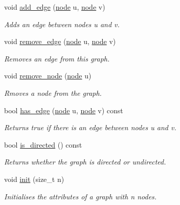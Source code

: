\begin{DoxyCompactItemize}
void \hyperlink{classlgraph_1_1udgraph_a4b847dd4d6d2e814f30bcddccc16cfc6}{add\+\_\+edge} (\hyperlink{namespacelgraph_a397169dd66adf725210a30fb7251773e}{node} u, \hyperlink{namespacelgraph_a397169dd66adf725210a30fb7251773e}{node} v)
\begin{DoxyCompactList}\small\item\em Adds an edge between nodes {\itshape u} and {\itshape v}. \end{DoxyCompactList}\item 
void \hyperlink{classlgraph_1_1udgraph_af1225a134bea314254c03e18a18a41d2}{remove\+\_\+edge} (\hyperlink{namespacelgraph_a397169dd66adf725210a30fb7251773e}{node} u, \hyperlink{namespacelgraph_a397169dd66adf725210a30fb7251773e}{node} v)
\begin{DoxyCompactList}\small\item\em Removes an edge from this graph. \end{DoxyCompactList}\item 
void \hyperlink{classlgraph_1_1udgraph_a043aab345008c5eedb4cf429f85e99df}{remove\+\_\+node} (\hyperlink{namespacelgraph_a397169dd66adf725210a30fb7251773e}{node} u)
\begin{DoxyCompactList}\small\item\em Rmoves a node from the graph. \end{DoxyCompactList}\item 
bool \hyperlink{classlgraph_1_1udgraph_a31370a81898abdc230ad2a3b0d274187}{has\+\_\+edge} (\hyperlink{namespacelgraph_a397169dd66adf725210a30fb7251773e}{node} u, \hyperlink{namespacelgraph_a397169dd66adf725210a30fb7251773e}{node} v) const
\begin{DoxyCompactList}\small\item\em Returns true if there is an edge between nodes {\itshape u} and {\itshape v}. \end{DoxyCompactList}\item 
bool \hyperlink{classlgraph_1_1udgraph_ab346eaf76d049a5148ffd87cda7eab6a}{is\+\_\+directed} () const
\begin{DoxyCompactList}\small\item\em Returns whether the graph is directed or undirected. \end{DoxyCompactList}\item 
void \hyperlink{classlgraph_1_1uxgraph_a539e735d68b55ce01d733262c9db34d5}{init} (size\+\_\+t n)
\begin{DoxyCompactList}\small\item\em Initialises the attributes of a graph with {\itshape n} nodes. \end{DoxyCompactList}\item 

\end{DoxyCompactItemize}
